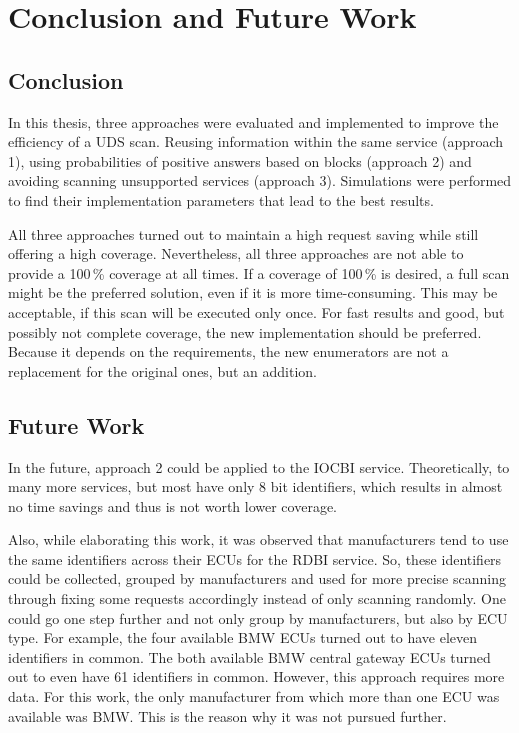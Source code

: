 \chapter{Conclusion and Future Work}

\section{Conclusion}

In this thesis, three approaches were evaluated and implemented to improve the efficiency of a UDS scan. Reusing information within the same service (approach 1), using probabilities of positive answers based on blocks (approach 2) and avoiding scanning unsupported services (approach 3). Simulations were performed to find their implementation parameters that lead to the best results.

All three approaches turned out to maintain a high request saving while still offering a high coverage.
Nevertheless, all three approaches are not able to provide a 100\,\% coverage at all times. 
If a coverage of 100\,\% is desired, a full scan might be the preferred solution, even if it is more time-consuming. This may be acceptable, if this scan will be executed only once. For fast results and good, but possibly not complete coverage, the new implementation should be preferred. Because it depends on the requirements, the new enumerators are not a replacement for the original ones, but an addition.

\section{Future Work}

In the future, approach 2 could be applied to the IOCBI service. Theoretically, to many more services, but most have only 8 bit identifiers, which results in almost no time savings and thus is not worth lower coverage.

Also, while elaborating this work, it was observed that manufacturers tend to use the same identifiers across their ECUs for the RDBI service. So, these identifiers could be collected, grouped by manufacturers and used for more precise scanning through fixing some requests accordingly instead of only scanning randomly. One could go one step further and not only group by manufacturers, but also by ECU type.
For example, the four available BMW ECUs turned out to have eleven identifiers in common. The both available BMW central gateway ECUs turned out to even have 61 identifiers in common. However, this approach requires more data. For this work, the only manufacturer from which more than one ECU was available was BMW. This is the reason why it was not pursued further.

